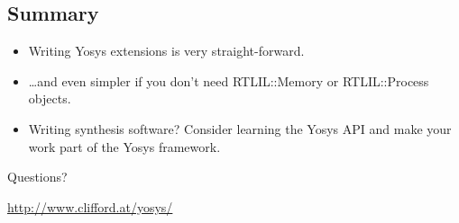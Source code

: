 
\subsection{Summary}

\begin{frame}{\subsecname}
\begin{itemize}
\item Writing Yosys extensions is very straight-forward.
\item \dots and even simpler if you don't need RTLIL::Memory or RTLIL::Process objects.

\bigskip
\item Writing synthesis software? Consider learning the Yosys API and make your work
part of the Yosys framework.
\end{itemize}

\bigskip
\bigskip
\begin{center}
Questions?
\end{center}

\bigskip
\bigskip
\begin{center}
\url{http://www.clifford.at/yosys/}
\end{center}
\end{frame}

